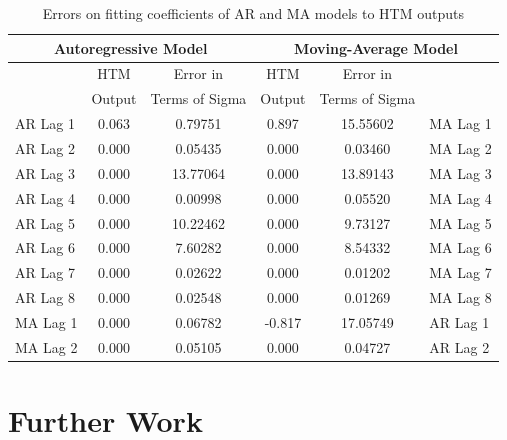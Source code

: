 \documentclass[oneside,12pt,openany]{book}
\begin{document}
	
	\begin{table}[]
		\centering
		\begin{tabular}{|l|c|c|c|c|l|}
			\hline
			\multicolumn{3}{|c|}{Autoregressive Model} & \multicolumn{3}{c|}{Moving-Average Model} \\ \hline
			\cellcolor{black} & HTM & Error in & HTM & Error in & \cellcolor{black} \\
			\cellcolor{black} & Output & Terms of Sigma & Output & Terms of Sigma & \cellcolor{black} \\ \hline
			AR Lag 1 & 0.063 & 0.79751 & 0.897 & 15.55602 & MA Lag 1 \\ \hline
			AR Lag 2 & 0.000 & 0.05435 & 0.000 & 0.03460 & MA Lag 2 \\ \hline
			AR Lag 3 & 0.000 & 13.77064 & 0.000 & 13.89143 & MA Lag 3 \\ \hline
			AR Lag 4 & 0.000 & 0.00998 & 0.000 & 0.05520 & MA Lag 4 \\ \hline
			AR Lag 5 & 0.000 & 10.22462 & 0.000 & 9.73127 & MA Lag 5 \\ \hline
			AR Lag 6 & 0.000 & 7.60282 & 0.000 & 8.54332 & MA Lag 6 \\ \hline
			AR Lag 7 & 0.000 & 0.02622 & 0.000 & 0.01202 & MA Lag 7 \\ \hline
			AR Lag 8 & 0.000 & 0.02548 & 0.000 & 0.01269 & MA Lag 8 \\ \hline
			MA Lag 1 & 0.000 & 0.06782 & -0.817 & 17.05749 & AR Lag 1 \\ \hline
			MA Lag 2 & 0.000 & 0.05105 & 0.000 & 0.04727 & AR Lag 2 \\ \hline
		\end{tabular}
		\label{tab:HTMARMAError}
		\caption{Errors on fitting coefficients of AR and MA models to HTM outputs}
	\end{table}

	
	
	\chapter{Further Work}
	
	
	
	\nocite{*}  %
	{}
	
\end{document}
